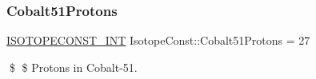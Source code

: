 \subsubsection{\texorpdfstring{Cobalt51\+Protons}{Cobalt51Protons}}
{\footnotesize\ttfamily \mbox{\hyperlink{group___isotope_const-_macros_ga5f18360b3e99483a35c32d789e62621c}{I\+S\+O\+T\+O\+P\+E\+C\+O\+N\+S\+T\+\_\+\+I\+NT}} Isotope\+Const\+::\+Cobalt51\+Protons = 27}

\$ \$ Protons in Cobalt-\/51. 